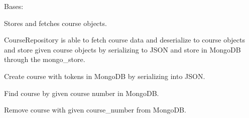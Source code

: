 \documentclass[letterpaper,10pt,english]{sphinxmanual}
\begin{document}

\begin{fulllineitems}
\label{cv_kickstarter:cv_kickstarter.course_repository.CourseRepository}
Bases: 

Stores and fetches course objects.

CourseRepository is able to fetch course data and deserialize to course
objects and store given course objects by serializing to JSON and
store in MongoDB through the mongo\_store.

\begin{fulllineitems}
\label{cv_kickstarter:cv_kickstarter.course_repository.CourseRepository.create}
Create course with tokens in MongoDB by serializing into JSON.

\end{fulllineitems}


\begin{fulllineitems}
\label{cv_kickstarter:cv_kickstarter.course_repository.CourseRepository.find_by_course_number}
Find course by given course number in MongoDB.

\end{fulllineitems}


\begin{fulllineitems}
\label{cv_kickstarter:cv_kickstarter.course_repository.CourseRepository.remove}
Remove course with given course\_number from MongoDB.

\end{fulllineitems}


\end{fulllineitems}

\end{document}
